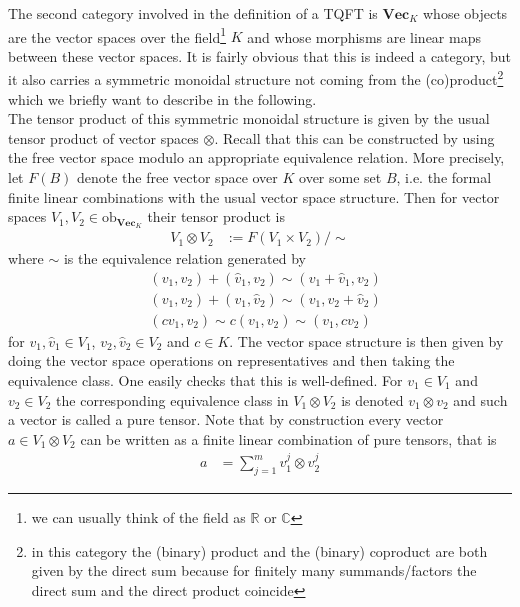 \nocite{0a816f4c}
The second category involved in the definition of a TQFT is $\mathbf{Vec}_{K}$ whose objects are the vector spaces over the field\footnote{we can usually think of the field as $\mathbb{R}$ or $\mathbb{C}$} $K$ and whose morphisms are linear maps between these vector spaces. It is fairly obvious that this is indeed a category, but it also carries a symmetric monoidal structure not coming from the (co)product\footnote{in this category the (binary) product and the (binary) coproduct are both given by the direct sum because for finitely many summands/factors the direct sum and the direct product coincide} which we briefly want to describe in the following.
\\
The tensor product of this symmetric monoidal structure is given by the usual tensor product of vector spaces $\otimes$. Recall that this can be constructed by using the free vector space modulo an appropriate equivalence relation. More precisely, let $F(B)$ denote the free vector space over $K$ over some set $B$, i.e. the formal finite linear combinations with the usual vector space structure. Then for vector spaces $V_{1},V_{2} \in \mathrm{ob}_{\mathbf{Vec}_{K}}$ their tensor product is
\begin{align*}
  V_{1}
  \otimes
  V_{2}
  &:=
  F(V_{1} \times V_{2})
  /
  \sim
\end{align*}
where $\sim$ is the equivalence relation generated by
\begin{align*}
  &
  (v_{1},v_{2})
  +
  (\hat{v}_{1},v_{2})
  \sim
  (v_{1} + \hat{v}_{1},v_{2})
  \\
  &
  (v_{1},v_{2})
  +
  (v_{1},\hat{v}_{2})
  \sim
  (v_{1},v_{2} + \hat{v}_{2})
  \\
  &
  (cv_{1},v_{2})
  \sim
  c
  (v_{1},v_{2})
  \sim
  (v_{1},cv_{2})
\end{align*}
for $v_{1},\hat{v}_{1} \in V_{1}$, $v_{2},\hat{v}_{2} \in V_{2}$ and $c \in K$. The vector space structure is then given by doing the vector space operations on representatives and then taking the equivalence class. One easily checks that this is well-defined. For $v_{1} \in V_{1}$ and $v_{2} \in V_{2}$ the corresponding equivalence class in $V_{1} \otimes V_{2}$ is denoted $v_{1} \otimes v_{2}$ and such a vector is called a pure tensor. Note that by construction every vector $a \in V_{1} \otimes V_{2}$ can be written as a finite linear combination of pure tensors, that is
\begin{align*}
  a
  &=
  \sum_{j=1}^{m}
  v_{1}^{j}
  \otimes
  v_{2}^{j}
\end{align*}
